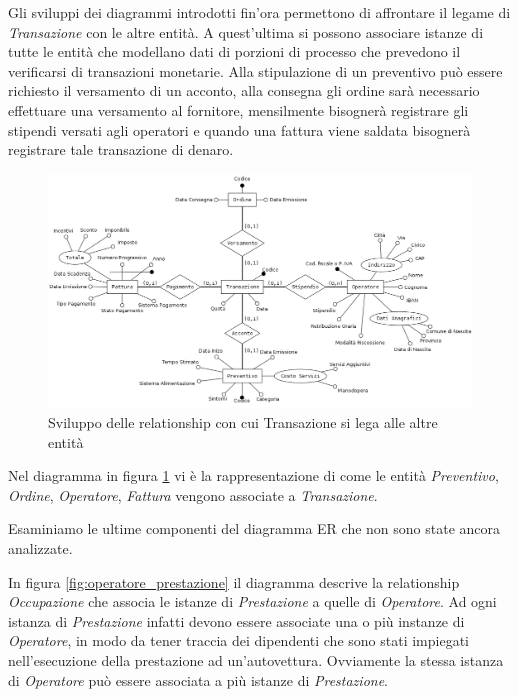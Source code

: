 			Gli sviluppi dei diagrammi introdotti fin'ora permettono di affrontare il legame di \emph{Transazione} con le altre entità. A quest'ultima si possono associare istanze di tutte le entità che modellano dati di porzioni di processo che prevedono il verificarsi di transazioni monetarie. Alla stipulazione di un preventivo può essere richiesto il versamento di un acconto, alla consegna gli ordine sarà necessario effettuare una versamento al fornitore, mensilmente bisognerà registrare gli stipendi versati agli operatori e quando una fattura viene saldata bisognerà registrare tale transazione di denaro.
			
			\begin{figure}
				\centering
				\includegraphics[width=13cm]{images/finitures/transazione_fattura_preventivo_operatore_ordine.png}
				\caption{Sviluppo delle relationship con cui Transazione si lega alle altre entità}
				\label{fig:transazione_fattura_preventivo_operatore_ordine}
			\end{figure}
			
			Nel diagramma in figura \ref{fig:transazione_fattura_preventivo_operatore_ordine} vi è la rappresentazione di come le entità \emph{Preventivo}, \emph{Ordine}, \emph{Operatore}, \emph{Fattura} vengono associate a \emph{Transazione}.
			
			Esaminiamo le ultime componenti del diagramma ER che non sono state ancora analizzate.
			
			In figura \ref{fig:operatore_prestazione} il diagramma descrive la relationship \emph{Occupazione} che associa le istanze di \emph{Prestazione} a quelle di \emph{Operatore}. Ad ogni istanza di \emph{Prestazione} infatti devono essere associate una o più instanze di \emph{Operatore}, in modo da tener traccia dei dipendenti che sono stati impiegati nell'esecuzione della prestazione ad un'autovettura. Ovviamente la stessa istanza di \emph{Operatore} può essere associata a più istanze di \emph{Prestazione}.
			
